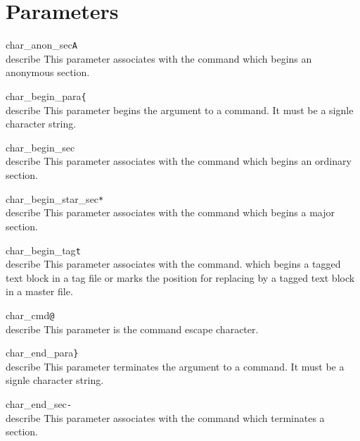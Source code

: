\section{Parameters}

\noindent\cmdrule

\begin{describepara}{char_anon_sec}{\verb*|A|}\\describe
This parameter associates with the  command
which begins an anonymous section. 
\end{describepara}
\begin{describepara}{char_begin_para}{\verb*|{|}\\describe
This parameter begins the argument to a command. It must be a signle
character string.
\end{describepara}
\begin{describepara}{char_begin_sec}{\verb*| |}\\describe
This parameter associates with the  command
which begins an ordinary section. 
\end{describepara}
\begin{describepara}{char_begin_star_sec}{\verb*|*|}\\describe
This parameter associates with the  command
which begins a major section. 
\end{describepara}
\begin{describepara}{char_begin_tag}{\verb*|t|}\\describe
This parameter associates with the  command.
which begins a tagged text block in a tag file or marks the position
for replacing by a tagged text block in a master file.
\end{describepara}
\begin{describepara}{char_cmd}{\verb*|@|}\\describe
This parameter is the command escape character.
\end{describepara}
\begin{describepara}{char_end_para}{\verb*|}|}\\describe
This parameter terminates the argument to a command. It must be a signle
character string.
\end{describepara}
\begin{describepara}{char_end_sec}{\verb*|-|}\\describe
This parameter associates with the  command
which terminates a section. 
\end{describepara}
